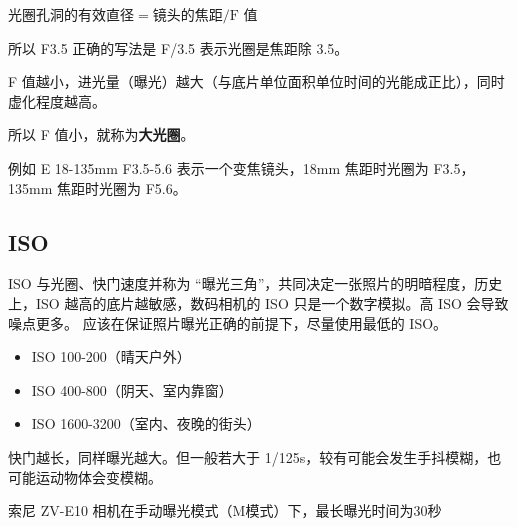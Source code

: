 $\text{光圈孔洞的有效直径} = \text{镜头的焦距}/\text{F 值}$

所以 F3.5 正确的写法是 F/3.5 表示光圈是焦距除 3.5。

F 值越小，进光量（曝光）越大（与底片单位面积单位时间的光能成正比），同时虚化程度越高。

所以 F 值小，就称为\textbf{大光圈}。

例如 E 18-135mm F3.5-5.6 表示一个变焦镜头，18mm 焦距时光圈为 F3.5， 135mm 焦距时光圈为 F5.6。

\subsection{ISO}
ISO 与光圈、快门速度并称为 “曝光三角”，共同决定一张照片的明暗程度，历史上，ISO 越高的底片越敏感，数码相机的 ISO 只是一个数字模拟。高 ISO 会导致噪点更多。 应该在保证照片曝光正确的前提下，尽量使用最低的 ISO。
\begin{itemize}
\item ISO 100-200（晴天户外）
\item ISO 400-800（阴天、室内靠窗）
\item ISO 1600-3200（室内、夜晚的街头）
\end{itemize}
快门越长，同样曝光越大。但一般若大于 1/125s，较有可能会发生手抖模糊，也可能运动物体会变模糊。


索尼 ZV-E10 相机在手动曝光模式（M模式）下，最长曝光时间为30秒